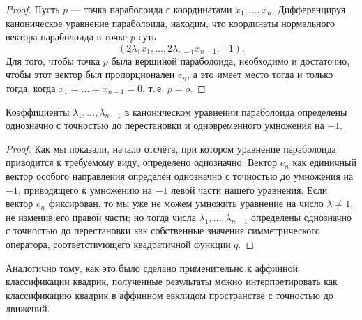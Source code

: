 \begin{enumerate}
        \begin{proof}
            Пусть $p$ --- точка параболоида с координатами $x_1, \ldots, x_n$. Дифференцируя каноническое уравнение параболоида, находим, что координаты нормального вектора параболоида в точке $p$ суть
            \[
                (2\lambda_1x_1, \ldots, 2\lambda_{n - 1}x_{n - 1}, -1).
            \]
            Для того, чтобы точка $p$ была вершиной параболоида, необходимо и достаточно, чтобы этот вектор был пропорционален $e_n$, а это имеет место тогда и только тогда, когда $x_1 = \ldots = x_{n - 1} = 0$, т.\,е. $p = o$.
        \end{proof}

        \begin{corollary}
            Коэффициенты $\lambda_1, \ldots, \lambda_{n - 1}$ в каноническом уравнении параболоида определены однозначно с точностью до перестановки и одновременного умножения на $-1$.
        \end{corollary}

        \begin{proof}
            Как мы показали, начало отсчёта, при котором уравнение параболоида приводится к требуемому виду, определено однозначно. Вектор $e_n$ как единичный вектор особого направления определён однозначно с точностью до умножения на $-1$, приводящего к умножению на $-1$ левой части нашего уравнения. Если вектор $e_n$ фиксирован, то мы уже не можем умножить уравнение на число $\lambda \ne 1$, не изменив его правой части; но тогда числа $\lambda_1, \ldots, \lambda_{n - 1}$ определены однозначно с точностью до перестановки как собственные значения симметрического оператора, соответствующего квадратичной функции $q$.
        \end{proof}
\end{enumerate}

Аналогично тому, как это было сделано применительно к аффинной классификации квадрик, полученные результаты можно интерпретировать как классификацию квадрик в аффинном евклидом пространстве с точностью до движений.

